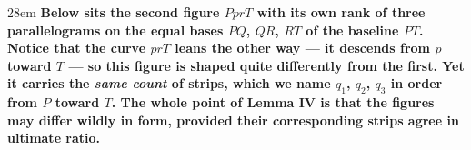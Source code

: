 \documentclass[border=4pt]{standalone}
\begin{document}
\begin{varwidth}{28em}
\large\bfseries
Below sits the second figure $PprT$ with its own rank of three parallelograms on the equal bases $PQ$, $QR$, $RT$ of the baseline $PT$. Notice that the curve $prT$ leans the other way --- it descends from $p$ toward $T$ --- so this figure is shaped quite differently from the first. Yet it carries the \emph{same count} of strips, which we name $q_1$, $q_2$, $q_3$ in order from $P$ toward $T$. The whole point of Lemma IV is that the figures may differ wildly in form, provided their corresponding strips agree in ultimate ratio.
\end{varwidth}
\end{document}
